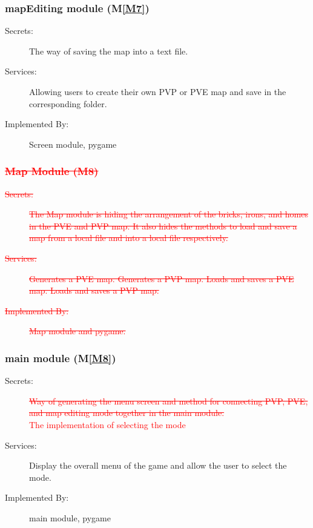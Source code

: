 \documentclass[12pt, titlepage]{article}
\DeclareRobustCommand{\hsout}[1]{\texorpdfstring{\sout{#1}}{#1}}
\newcommand{\mref}[1]{M\ref{#1}}
\begin{document}
\subsubsection{mapEditing module (\mref{M7})}
\begin{description}
\item[Secrets:] The way of saving the map into a text file.
\item[Services:] Allowing users to create their own PVP or PVE map and save in the corresponding folder.
\item[Implemented By:] Screen module, pygame
\end{description}

\subsubsection{\textcolor{red}{\hsout{Map Module (M8)}}}
\begin{description}
\item[\textcolor{red}{\sout{Secrets:}}] \textcolor{red}{\sout{The Map module is hiding the arrangement of the bricks, irons, and homes in the PVE and PVP map. It also hides the methods to load and save a map from a local file and into a local file respectively.}}
\item[\textcolor{red}{\sout{Services:}}] \textcolor{red}{\sout{Generates a PVE map. Generates a PVP map. Loads and saves a PVE map. Loads and saves a PVP map.}}
\item[\textcolor{red}{\sout{Implemented By:}}] \textcolor{red}{\sout{Map module and pygame.}}
\end{description}

\subsubsection{main module (\mref{M8})}
\begin{description}
\item[Secrets:] \textcolor{red}{\sout{Way of generating the menu screen and method for connecting PVP, PVE, and map editing mode together in the main module.}\\ The implementation of selecting the mode}
\item[Services:] Display the overall menu of the game and allow the user to select the mode.
\item[Implemented By:] main module, pygame
\end{description}
\end{document}
